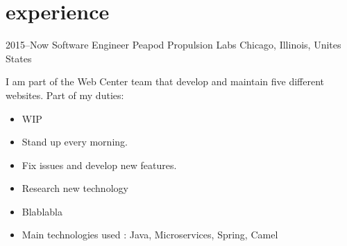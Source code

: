 \documentclass[]{friggeri-cv} %
\begin{document}

\section{experience}


\begin{entrylist}

\entry
{2015--Now}
{Software Engineer} 
{Peapod Propulsion Labs}
{Chicago, Illinois, Unites States}
{I am part of the Web Center team that develop and maintain five different websites. Part of my duties:\\

\vspace{-4mm}
\begin{itemize}
	\item WIP
	\item Stand up every morning.
	\item Fix issues and develop new features.
	\item Research new technology
	\item Blablabla
	\item Main technologies used : Java, Microservices, Spring, Camel
\end{itemize}}
\vspace{-7mm}

\end{entrylist}

\end{document}
